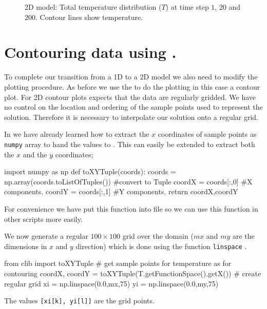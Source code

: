 \begin{figure}[ht]
\caption{2D model: Total temperature distribution ($T$) at time step $1$, $20$ and $200$. Contour lines show temperature.}
\label{fig:twodhdans}
\end{figure}

\section{Contouring \esc data using \modmpl.}
\label{Sec:2DHD plot}
To complete our transition from a 1D to a 2D model we also need to modify the 
plotting procedure. As before we use the  \modmpl to do the plotting 
in this case a contour plot. For 2D contour plots \modmpl expects that the
data are regularly gridded. We have no control on the location and ordering of the sample points
used to represent the solution. Therefore it is necessary to interpolate our solution onto a regular grid.

In  we have already learned how to extract the $x$ coordinates of sample points as 
\verb|numpy| array to hand the values to \modmpl. This can easily be extended to extract both the
$x$ and the $y$ coordinates;
\begin{python}
import numpy as np
def toXYTuple(coords):
    coords = np.array(coords.toListOfTuples()) #convert to Tuple
    coordX = coords[:,0] #X components.
    coordY = coords[:,1] #Y components.
    return coordX,coordY
\end{python}
For convenience we have put this function into  file so we can use this
function in other scripts more easily. 


We now generate a regular $100 \times 100$ grid over the domain ($mx$ and $my$ 
are the dimensions in $x$ and $y$ direction) which is done using the \modnumpy function \verb|linspace|  . 
\begin{python}
from clib import toXYTuple
# get sample points for temperature as  for contouring      
coordX, coordY = toXYTuple(T.getFunctionSpace().getX())
# create regular grid
xi = np.linspace(0.0,mx,75)
yi = np.linspace(0.0,my,75)
\end{python}
The values \verb|[xi[k], yi[l]]| are the grid points.

